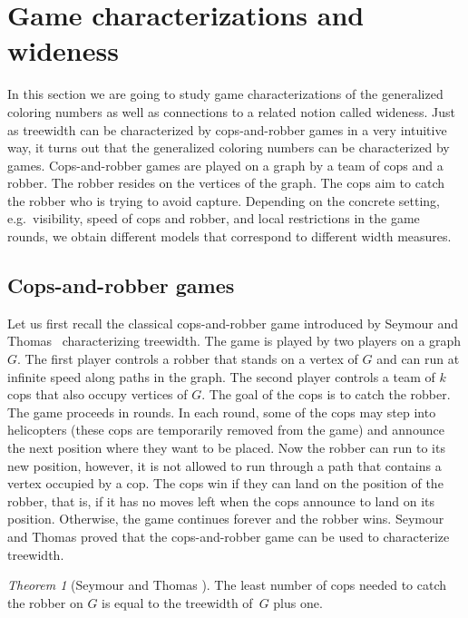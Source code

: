 \documentclass[1p,number,a4paper]{elsarticle}
\theoremstyle{remark}
\newtheorem{theorem}{Theorem}[section]
\begin{document}

\section{Game characterizations and wideness}\label{sec:Splitter}

In this section we are going to study game characterizations of the generalized coloring numbers as well as connections to a related notion called wideness. 
Just as treewidth can be characterized by cops-and-robber games in a very intuitive way, it turns out that the generalized coloring numbers can be characterized by games. Cops-and-robber games are played on a graph by a team of cops and a robber. The robber resides on the vertices of the graph. The cops aim to catch the robber who is trying to avoid capture. 
Depending on the concrete setting, e.g.\ visibility, speed of cops and robber, and local restrictions in the game rounds, we obtain different models that correspond to different width measures. 

\subsection{Cops-and-robber games}

Let us first recall the classical cops-and-robber game introduced by Seymour and Thomas~\cite{seymour1993graph} characterizing treewidth. 
The game is played by two players on a graph $G$. The first player controls a robber that stands on a vertex of $G$ and can run at infinite speed along paths in the graph. The second player controls a team of $k$ cops that also occupy vertices of $G$. 
The goal of the cops is to catch the robber. The game proceeds in rounds. In each round, some of the cops may step into helicopters (these cops are temporarily removed from the game) and announce the next position where they want to be placed. Now the robber can run to its new position, however, it is not allowed to run through a path that contains a vertex occupied by a cop. The cops win if they can land on the position of the robber, that is, if it has no moves left when the cops announce to land on its position. 
Otherwise, the game continues forever and the robber wins. 
Seymour and Thomas proved that the cops-and-robber game can be used to characterize treewidth. 

\begin{theorem}[Seymour and Thomas \cite{seymour1993graph}]
The least number of cops needed to catch the robber on $G$ is equal to the treewidth of~$G$ plus one.    
\end{theorem}
\end{document}
